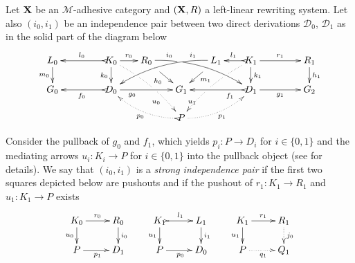 \documentclass[a4paper,UKenglish,cleveref,pdftex,thm-restate,numberwithinsect]{lipics-v2021}
\def\R{\mathsf{R}}
\def\X{\textbf {\textup{X}}}
\def\G{\textbf {\textup{G}}}
\newcommand{\dder}[1]{\mathscr{#1}}
\begin{document}
\begin{definition}
  \label{def:filler}
  Let $\X$ be an $\mathcal{M}$-adhesive category 
  and $(\X, \R)$ a left-linear rewriting system. 
  Let also $(i_0, i_1)$ be an independence pair between two direct
  derivations $\dder{D}_0$, $\dder{D}_1$
  as in the solid part of the diagram below
  \[
    \xymatrix@C=18pt@R=16pt{L_0 \ar[d]_{m_0}&& K_0
      \ar[d]_{k_0}\ar@{>->}[ll]_{l_0} \ar[r]^{r_0} \ar@{.>}@/^.20cm/[ddrr]|(.32)\hole|(.57)\hole_(.7){u_0} & R_0
      \ar@/^.35cm/[drrr]|(.3)\hole^(.2){i_0} \ar[dr]|(.3)\hole_{h_0}
      && L_1 \ar@/_.35cm/[dlll]_(.2){i_1} \ar[dl]|(.3)\hole^{m_1}& K_1
      \ar[d]^{k_1}\ar@{>->}[l]_{l_1} \ar[rr]^{r_1} \ar@{.>}@/_.20cm/[ddll]|(.32)\hole|(.57)\hole^(.7){u_1} && R_1 \ar[d]^{h_1} \\
      G_0 &&
      \ar@{>->}[ll]^{f_0} D_0 \ar[rr]_(.3){g_0}&& G_1 &&
      \ar@{>->}[ll]^(.3){f_1} D_1 \ar[rr]_{g_1}&& G_2\\
      & & & & P \ar@/^.3cm/@{>.>}[ull]^{p_0} \ar@/_.3cm/@{.>}[urr]_{p_1}
    }
  \]

  Consider the pullback of $g_0$ and $f_1$, which yields $p_i : P \to D_i$
  for $i \in \{0,1\}$ and the mediating arrows $u_i\colon K_i\to P$ 
  for $i \in \{0,1\}$ 
  into the pullback object (see  for details). 
  We say that $(i_0, i_1)$ is a \emph{strong independence pair} if
  the first two squares depicted  
  below are pushouts and if the pushout of $r_1 : K_1 \to R_1$ and $u_1 : K_1 \to P$ exists
  \[
    \xymatrix@R=16pt{
      K_0 \ar[r]^{r_0} \ar[d]_{u_0}& R_0 \ar[d]^{i_0} & K_1
      \ar@{>->}[r]^{l_1} \ar[d]_{u_1}& L_1 \ar[d]^{i_1}
       &K_1 \ar[r]^{r_1} \ar[d]_{u_1}& R_1\ar@{.>}[d]^{j_0}
      \\
      P \ar[r]_{p_1} & D_1 &P \ar[r]_{p_0} & D_0
       & P \ar@{.>}[r]_{q_1} & Q_1
    }
  \]
\end{definition}


\end{document}
